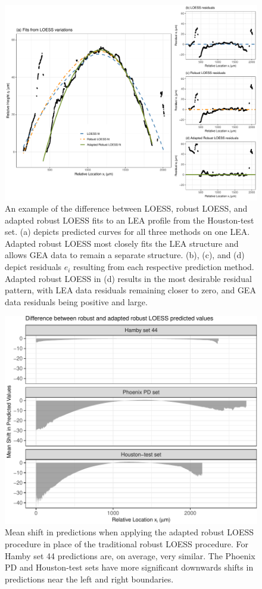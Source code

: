 \documentclass[12pt]{article}
\begin{document}
\begin{figure}
\centering
\includegraphics[width=\textwidth]{../images/loess_comparison_plot_all}
\caption{An example of the difference between LOESS, robust LOESS, and adapted robust LOESS fits to an LEA profile from the Houston-test set. (a) depicts predicted curves for all three methods on one LEA. Adapted robust LOESS most closely fits the LEA structure and allows GEA data to remain a separate structure. (b), (c), and (d) depict residuals $e_i$ resulting from each respective prediction method. Adapted robust LOESS in (d) results in the most desirable residual pattern, with LEA data residuals remaining closer to zero, and GEA data residuals being positive and large.}  
\label{houston-adapted-rlo-pdf}
\end{figure}

\begin{figure}
\centering
\includegraphics{writeup_files/figure-latex/adapted-rlo-shift-1.pdf}
\caption{\label{adapted-rlo-shift}Mean shift in predictions when
applying the adapted robust LOESS procedure in place of the traditional
robust LOESS procedure. For Hamby set 44 predictions are, on average,
very similar. The Phoenix PD and Houston-test sets have more significant
downwards shifts in predictions near the left and right boundaries.}
\end{figure}
\end{document}
